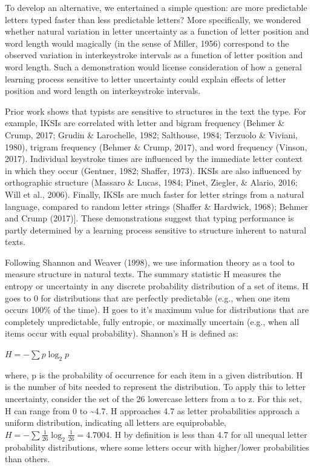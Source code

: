 \documentclass[floatsintext,man]{apa6}
\theoremstyle{definition}
\theoremstyle{definition}
\theoremstyle{definition}
\theoremstyle{remark}
\begin{document}
To develop an alternative, we entertained a simple question: are more
predictable letters typed faster than less predictable letters? More
specifically, we wondered whether natural variation in letter
uncertainty as a function of letter position and word length would
magically (in the sense of Miller, 1956) correspond to the observed
variation in interkeystroke intervals as a function of letter position
and word length. Such a demonstration would license consideration of how
a general learning process sensitive to letter uncertainty could explain
effects of letter position and word length on interkeystroke intervals.

Prior work shows that typists are sensitive to structures in the text
the type. For example, IKSIs are correlated with letter and bigram
frequency (Behmer \& Crump, 2017; Grudin \& Larochelle, 1982; Salthouse,
1984; Terzuolo \& Viviani, 1980), trigram frequency (Behmer \& Crump,
2017), and word frequency (Vinson, 2017). Individual keystroke times are
influenced by the immediate letter context in which they occur (Gentner,
1982; Shaffer, 1973). IKSIs are also influenced by orthographic
structure (Massaro \& Lucas, 1984; Pinet, Ziegler, \& Alario, 2016; Will
et al., 2006). Finally, IKSIs are much faster for letter strings from a
natural language, compared to random letter strings (Shaffer \&
Hardwick, 1968); Behmer and Crump (2017){]}. These demonstrations
suggest that typing performance is partly determined by a learning
process sensitive to structure inherent to natural texts.

Following Shannon and Weaver (1998), we use information theory as a tool
to measure structure in natural texts. The summary statistic H measures
the entropy or uncertainty in any discrete probability distribution of a
set of items. H goes to 0 for distributions that are perfectly
predictable (e.g., when one item occurs 100\% of the time). H goes to
it's maximum value for distributions that are completely unpredictable,
fully entropic, or maximally uncertain (e.g., when all items occur with
equal probability). Shannon's H is defined as:

\(H = -\sum p \log_2 p\)

where, p is the probability of occurrence for each item in a given
distribution. H is the number of bits needed to represent the
distribution. To apply this to letter uncertainty, consider the set of
the 26 lowercase letters from a to z. For this set, H can range from 0
to \textasciitilde{}4.7. H approaches 4.7 as letter probabilities
approach a uniform distribution, indicating all letters are
equiprobable, \(H = -\sum \frac{1}{26} \log_2 \frac{1}{26} = 4.7004\). H
by definition is less than 4.7 for all unequal letter probability
distributions, where some letters occur with higher/lower probabilities
than others.
\end{document}
